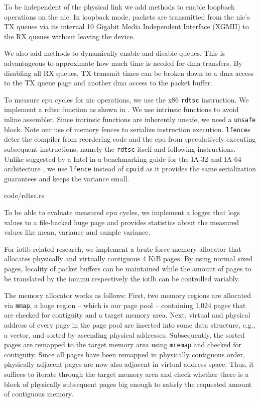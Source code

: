 To be independent of the physical link we add methods to enable loopback
operations on the \ac{nic}. In loopback mode, packets are transmitted from the
\ac{nic}'s TX queues via its internal 10 Gigabit Media Independent Interface
(XGMII) to the RX queues without leaving the device.

We also add methods to dynamically enable and disable queues. This is
advantageous to approximate how much time is needed for \ac{dma} transfers. By
disabling all RX queues, TX transmit times can be broken down to a \ac{dma}
access to the TX queue page and another \ac{dma} access to the packet buffer.

To measure \ac{cpu} cycles for \ac{nic} operations, we use the x86
\texttt{rdtsc} instruction. We implement a rdtsc function as shown in
. We use intrinsic functions to avoid inline assembler. Since
intrinsic functions are inherently unsafe, we need a \texttt{unsafe} block.
Note our use of memory fences to serialize instruction execution.
\texttt{lfence}s deter the compiler from reordering code and the \ac{cpu} from
speculatively executing subsequent instructions, namely the \texttt{rdtsc}
itself and following instructions. Unlike suggested by a Intel in a benchmarking
guide for the IA-32 and IA-64 architecture \cite{paoloni2010benchmark}, we use
\texttt{lfence} instead of \texttt{cpuid} as it provides the same serialization
guarantees and keeps the variance small.

\begin{minipage}{\textwidth}
    
        {code/rdtsc.rs}
\end{minipage}

To be able to evaluate measured \ac{cpu} cycles, we implement a logger that logs
values to a file-backed huge page and provides statistics about the measured
values like mean, variance and sample variance.

For \ac{iotlb}-related research, we implement a brute-force memory allocator
that allocates physically and virtually contiguous 4 KiB pages. By using normal
sized pages, locality of packet buffers can be maintained while the amount of
pages to be translated by the \ac{iommu} respectively the \ac{iotlb} can be
controlled variably.

The memory allocator works as follows: First, two memory regions are allocated
via \texttt{mmap}, a huge region -- which is our page pool -- containing 1,024
pages that are checked for contiguity and a target memory area. Next, virtual
and physical address of every page in the page pool are inserted into some data
structure, e.g., a vector, and sorted by ascending physical addresses.
Subsequently, the sorted pages are remapped to the target memory area using
\texttt{mremap} and checked for contiguity. Since all pages have been remapped
in physically contiguous order, physically adjacent pages are now also adjacent
in virtual address space. Thus, it suffices to iterate through the target memory
area and check whether there is a block of physically subsequent pages big
enough to satisfy the requested amount of contiguous memory.

